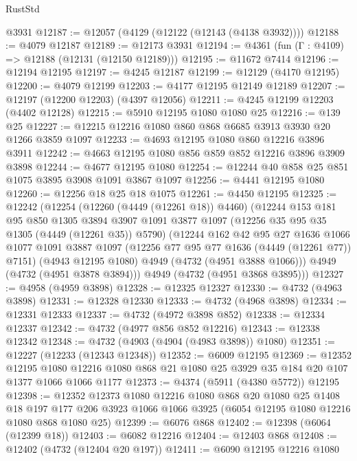 \begin{lexlean}{RustStd}
\begin{coremodule}
{\begin{coremodule}
{{{{{{{{{{{{{{    @3931
@12187 := @12057 (@4129 (@12122 (@12143 (@4138 @3932))))
@12188 := @4079 @12187
@12189 := @12173 @3931
@12194 := @4361 (fun (Γ : @4109) => @12188 (@12131 (@12150 @12189)))
@12195 := @11672 @7414
@12196 := @12194 @12195
@12197 := @4245 @12187
@12199 := @12129 (@4170 @12195)
@12200 := @4079 @12199
@12203 := @4177 @12195 @12149 @12189
@12207 := @12197 (@12200 @12203) (@4397 @12056)
@12211 := @4245 @12199 @12203 (@4402 @12128)
@12215 := @5910 @12195 @1080 @1080 @25
@12216 := @139 @25
@12227 := @12215 @12216 @1080 @860 @868 @6685 @3913 @3930 @20 @1266 @3859 @1097
@12233 := @4693 @12195 @1080 @860 @12216 @3896 @3911
@12242 := @4663 @12195 @1080 @856 @859 @852 @12216 @3896 @3909 @3898
@12244 := @4677 @12195 @1080
@12254 := @12244 @40 @858 @25 @851 @1075 @3895 @3908 @1091 @3867 @1097
@12256 := @4441 @12195 @1080
@12260 := @12256 @18 @25 @18 @1075
@12261 := @4450 @12195
@12325 := @12242
    (@12254
      (@12260 (@4449 (@12261 @18)) @4460)
      (@12244
        @153
        @181
        @95
        @850
        @1305
        @3894
        @3907
        @1091
        @3877
        @1097
        (@12256 @35 @95 @35 @1305 (@4449 (@12261 @35)) @5790)
        (@12244
          @162
          @42
          @95
          @27
          @1636
          @1066
          @1077
          @1091
          @3887
          @1097
          (@12256 @77 @95 @77 @1636 (@4449 (@12261 @77)) @7151)
          (@4943 @12195 @1080)
          @4949
          (@4732 (@4951 @3888 @1066)))
        @4949
        (@4732 (@4951 @3878 @3894)))
      @4949
      (@4732 (@4951 @3868 @3895)))
@12327 := @4958 (@4959 @3898)
@12328 := @12325 @12327
@12330 := @4732 (@4963 @3898)
@12331 := @12328 @12330
@12333 := @4732 (@4968 @3898)
@12334 := @12331 @12333
@12337 := @4732 (@4972 @3898 @852)
@12338 := @12334 @12337
@12342 := @4732 (@4977 @856 @852 @12216)
@12343 := @12338 @12342
@12348 := @4732 (@4903 (@4904 (@4983 @3898)) @1080)
@12351 := @12227 (@12233 (@12343 @12348))
@12352 := @6009 @12195
@12369 := @12352
    @12195
    @1080
    @12216
    @1080
    @868
    @21
    @1080
    @25
    @3929
    @35
    @184
    @20
    @107
    @1377
    @1066
    @1066
    @1177
@12373 := @4374 (@5911 (@4380 @5772)) @12195
@12398 := @12352
    @12373
    @1080
    @12216
    @1080
    @868
    @20
    @1080
    @25
    @1408
    @18
    @197
    @177
    @206
    @3923
    @1066
    @1066
    @3925
    (@6054 @12195 @1080 @12216 @1080 @868 @1080 @25)
@12399 := @6076 @868
@12402 := @12398 (@6064 (@12399 @18))
@12403 := @6082 @12216
@12404 := @12403 @868
@12408 := @12402 (@4732 (@12404 @20 @197))
@12411 := @6090 @12195 @12216 @1080
}}}}}}}}}}}}}}
\end{coremodule}}
\end{coremodule}
\end{lexlean}

